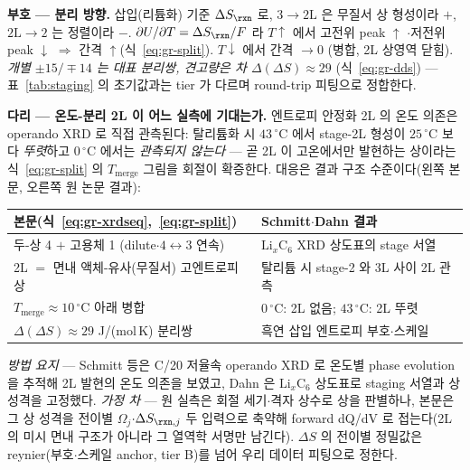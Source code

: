 \begin{signbox}
\textbf{부호 --- 분리 방향.} 삽입(리튬화) 기준 $\Delta S_{\rxn}$ 로, $3\!\to\!2\mathrm L$ 은 무질서 상 형성이라 $+$,
$2\mathrm L\!\to\!2$ 는 정렬이라 $-$. $\partial U/\partial T=\Delta S_{\rxn}/F$ 라 $T\!\uparrow$ 에서 고전위 peak $\uparrow$
$\cdot$저전위 peak $\downarrow$ $\Rightarrow$ 간격 $\uparrow$(식~\eqref{eq:gr-split}). $T\!\downarrow$ 에서 간격
$\to0$ (병합, 2L 상영역 닫힘). \emph{개별 $\pm15/\mp14$ 는 대표 분리쌍, 견고량은 차 $\Delta(\Delta S)\!\approx\!29$}
(식~\eqref{eq:gr-dds}) --- 표~\ref{tab:staging} 의 초기값과는 tier 가 다르며 round-trip 피팅으로 정합한다.
\end{signbox}

\begin{srcbox}
\textbf{다리 --- 온도-분리 2L 이 어느 실측에 기대는가.} 엔트로피 안정화 2L 의 온도 의존은 operando XRD 로
직접 관측된다\cite{schmitt2022}: 탈리튬화 시 $43\,^\circ$C 에서 stage-2L 형성이 $25\,^\circ$C 보다 \emph{뚜렷}하고
$0\,^\circ$C 에서는 \emph{관측되지 않는다} --- 곧 2L 이 고온에서만 발현하는 상이라는 식~\eqref{eq:gr-split} 의
$T_{\mathrm{merge}}$ 그림을 회절이 확증한다. 대응은 결과 구조 수준이다(왼쪽 본문, 오른쪽 원 논문 결과):
\begin{center}\footnotesize
\begin{tabular}{@{}ll@{}}
\hline
본문(식~\eqref{eq:gr-xrdseq},~\eqref{eq:gr-split}) & Schmitt\cite{schmitt2022}$\cdot$Dahn\cite{dahn1991} 결과 \\
\hline
두-상 4 $+$ 고용체 1 (dilute$\cdot4\!\leftrightarrow\!3$ 연속) & $\mathrm{Li}_x\mathrm{C_6}$ XRD 상도표의 stage 서열\cite{dahn1991} \\
2L $=$ 면내 액체-유사(무질서) 고엔트로피 상 & 탈리튬 시 stage-2 와 3L 사이 2L 관측\cite{schmitt2022} \\
$T_{\mathrm{merge}}\!\approx\!10\,^\circ$C 아래 병합 & $0\,^\circ$C: 2L 없음; $43\,^\circ$C: 2L 뚜렷\cite{schmitt2022} \\
$\Delta(\Delta S)\!\approx\!29$ J/(mol\,K) 분리쌍 & 흑연 삽입 엔트로피 부호$\cdot$스케일\cite{reynier2003} \\
\hline
\end{tabular}
\end{center}
\emph{방법 요지} --- Schmitt 등은 C/20 저율속 operando XRD 로 온도별 phase evolution 을 추적해 2L 발현의
온도 의존을 보였고, Dahn 은 $\mathrm{Li}_x\mathrm{C_6}$ 상도표로 staging 서열과 상 성격을 고정했다. \emph{가정 차} ---
원 실측은 회절 세기$\cdot$격자 상수로 상을 판별하나, 본문은 그 상 성격을 전이별 $\Omega_j$$\cdot\Delta S_{\rxn,j}$
두 입력으로 축약해 forward dQ/dV 로 접는다(2L 의 미시 면내 구조가 아니라 그 열역학 서명만 남긴다). $\Delta S$ 의
전이별 정밀값은 reynier\cite{reynier2003}(부호$\cdot$스케일 anchor, tier B)를 넘어 우리 데이터 피팅으로 정한다.
\end{srcbox}

